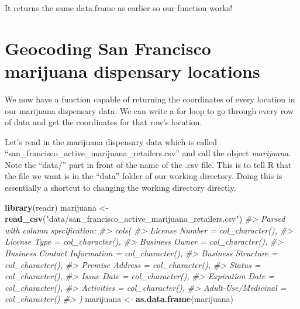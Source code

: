 \documentclass[
  12pt,
]{book}
\newenvironment{Shaded}{\begin{snugshade}}{\end{snugshade}}
\newcommand{\CommentTok}[1]{\textcolor[rgb]{0.37,0.37,0.37}{\textit{#1}}}
\newcommand{\KeywordTok}[1]{\textcolor[rgb]{0.27,0.27,0.27}{\textbf{#1}}}
\newcommand{\NormalTok}[1]{#1}
\newcommand{\StringTok}[1]{\textcolor[rgb]{0.5,0.5,0.5}{#1}}
\begin{document}
It returns the same data.frame as earlier so our function works!

\hypertarget{geocoding-san-francisco-marijuana-dispensary-locations}{%
\section{Geocoding San Francisco marijuana dispensary locations}\label{geocoding-san-francisco-marijuana-dispensary-locations}}

We now have a function capable of returning the coordinates of every location in our marijuana dispensary data. We can write a for loop to go through every row of data and get the coordinates for that row's location.

Let's read in the marijuana dispensary data which is called ``san\_francisco\_active\_marijuana\_retailers.csv'' and call the object \emph{marijuana}. Note the ``data/'' part in front of the name of the .csv file. This is to tell R that the file we want is in the ``data'' folder of our working directory. Doing this is essentially a shortcut to changing the working directory directly.

\begin{Shaded}
\begin{Highlighting}[]
\KeywordTok{library}\NormalTok{(readr)}
\NormalTok{marijuana <{-}}\StringTok{ }\KeywordTok{read\_csv}\NormalTok{(}\StringTok{"data/san\_francisco\_active\_marijuana\_retailers.csv"}\NormalTok{)}
\CommentTok{\#> Parsed with column specification:}
\CommentTok{\#> cols(}
\CommentTok{\#>   \textasciigrave{}License Number\textasciigrave{} = col\_character(),}
\CommentTok{\#>   \textasciigrave{}License Type\textasciigrave{} = col\_character(),}
\CommentTok{\#>   \textasciigrave{}Business Owner\textasciigrave{} = col\_character(),}
\CommentTok{\#>   \textasciigrave{}Business Contact Information\textasciigrave{} = col\_character(),}
\CommentTok{\#>   \textasciigrave{}Business Structure\textasciigrave{} = col\_character(),}
\CommentTok{\#>   \textasciigrave{}Premise Address\textasciigrave{} = col\_character(),}
\CommentTok{\#>   Status = col\_character(),}
\CommentTok{\#>   \textasciigrave{}Issue Date\textasciigrave{} = col\_character(),}
\CommentTok{\#>   \textasciigrave{}Expiration Date\textasciigrave{} = col\_character(),}
\CommentTok{\#>   Activities = col\_character(),}
\CommentTok{\#>   \textasciigrave{}Adult{-}Use/Medicinal\textasciigrave{} = col\_character()}
\CommentTok{\#> )}
\NormalTok{marijuana <{-}}\StringTok{ }\KeywordTok{as.data.frame}\NormalTok{(marijuana)}
\end{Highlighting}
\end{Shaded}
\end{document}
